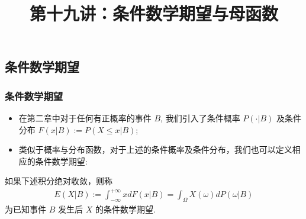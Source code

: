 \documentclass[Prob-All.tex]{subfiles}
\begin{document}
\title[概率论]{第十九讲：条件数学期望与母函数}
\date{}

{ 
	\begin{frame}
		\titlepage
	\end{frame}
}


\subsection{条件数学期望}
\begin{frame}
	\frametitle{条件数学期望}
	\begin{itemize}[<+-|alert@+>]
		\item 在第二章中对于任何有正概率的事件 $B$, 我们引入了条件概率 $P (\cdot|B)$ 及条件分布 $F (x|B):=P (X\le x|B)$;
		\item 类似于概率与分布函数，对于上述的条件概率及条件分布，我们也可以定义相应的条件数学期望:


	\end{itemize}
	\pause
	\begin{defi}
		如果下述积分绝对收敛，则称
		\begin{eqnarray*}
			E(X|B):=\int_{-\infty}^{+\infty}xdF(x|B)=\int_{\Omega}X(\omega)dP(\omega|B)
		\end{eqnarray*}
		为已知事件 $B$ 发生后 $X$ 的条件数学期望.
	\end{defi}
\end{frame}
\end{document}
